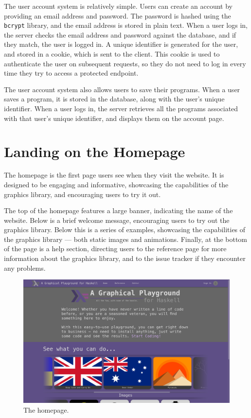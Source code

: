\documentclass[../main.tex]{subfiles}
\begin{document}
        The user account system is relatively simple.
        Users can create an account by providing an email address and password.
        The password is hashed using the \texttt{bcrypt} library, and the email address
            is stored in plain text.
        When a user logs in, the server checks the email address and password against
            the database, and if they match, the user is logged in.
        A unique identifier is generated for the user, and stored in a cookie, which is
            sent to the client.
        This cookie is used to authenticate the user on subsequent requests, so they do
            not need to log in every time they try to access a protected endpoint.

        The user account system also allows users to save their programs.
        When a user saves a program, it is stored in the database, along with the
            user's unique identifier.
        When a user logs in, the server retrieves all the programs associated with that
            user's unique identifier, and displays them on the account page.

    \section{Landing on the Homepage}
        The homepage is the first page users see when they visit the website.
        It is designed to be engaging and informative, showcasing the capabilities of
            the graphics library, and encouraging users to try it out.

        The top of the homepage features a large banner, indicating the name of the
            website.
        Below is a brief welcome message, encouraging users to try out the graphics
            library.
        Below this is a series of examples, showcasing the capabilities of the graphics
            library — both static images and animations.
        Finally, at the bottom of the page is a help section, directing users to the
            reference page for more information about the graphics library, and to the
            issue tracker if they encounter any problems.

        \begin{figure}[H]
            \centering
            \includegraphics[width=0.75\linewidth]{images/homepage.png}
                \caption{The homepage.}
                \label{fig:homepage}
        \end{figure}
\end{document}
